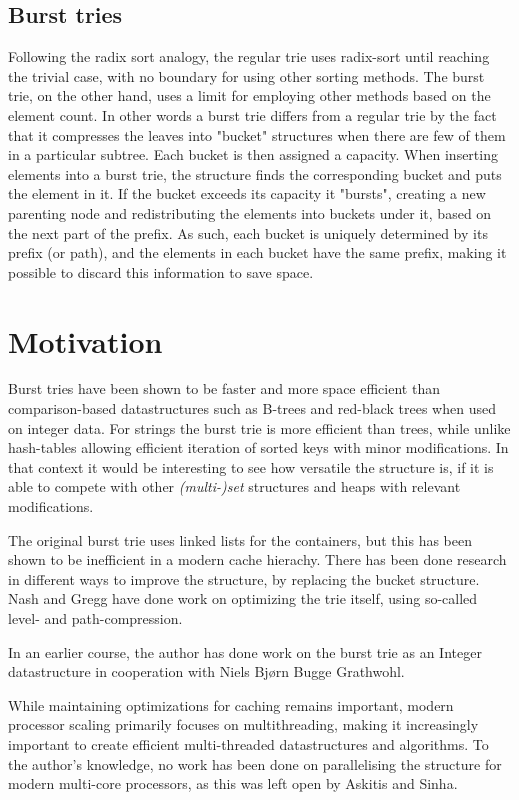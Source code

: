 \documentclass[a4paper, oneside, draft]{memoir}
\begin{document}
\subsection{Burst tries}
Following the radix sort analogy, the regular trie uses radix-sort until
reaching the trivial case, with no boundary for using other sorting methods.
The burst trie, on the other hand, uses a limit for employing other methods
based on 
the element count. In other words a burst trie differs from a regular trie by
the fact that it compresses the leaves into "bucket" structures when there are
few of them in a particular subtree. Each bucket is then assigned a capacity.
When inserting elements into a burst trie, the structure finds the corresponding
bucket and puts the element in it. If the bucket exceeds its capacity it 
"bursts", creating a new parenting node and redistributing the elements 
into buckets under it, based on the next part of the prefix.
As such, each bucket is uniquely determined by its prefix (or path),
and the elements in each bucket have the same prefix, making it possible to
discard this information to save space.

\section{Motivation}
Burst tries have been shown to be faster and more space efficient than
compari\-son-based datastructures such as B-trees and red-black trees
when used on integer data.
For strings the burst trie is more efficient than trees, while unlike
hash-tables allowing efficient iteration of sorted keys with minor modifications.
In that context it would be interesting to see how versatile the structure is,
if it is able to compete with other \textit{(multi-)set} structures and heaps with
relevant modifications.

The original burst trie uses linked lists for the containers, but this has been
shown to be inefficient in a modern cache hierachy. There has been done research
in different ways to improve the structure, by replacing the bucket structure.
Nash and Gregg have done work on optimizing the trie itself, using so-called
level- and path-compression.

In an earlier course, the author has done work on the burst trie as an Integer
datastructure in cooperation with Niels Bjørn Bugge Grathwohl.

While maintaining optimizations for caching remains important, modern processor
scaling primarily focuses on multithreading, making it increasingly important
to create efficient multi-threaded datastructures and algorithms.
To the author's knowledge, no work has been done on parallelising the structure
for modern multi-core processors, as this was left open by Askitis and Sinha.
\end{document}
